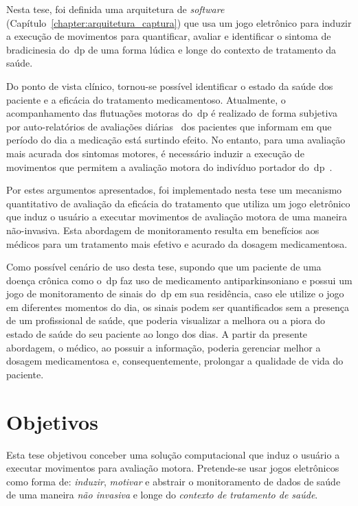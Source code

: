 Nesta tese, foi definida uma arquitetura de \textit{software} (Capítulo~\ref{chapter:arquitetura_captura}) que usa um jogo eletrônico para induzir a execução de movimentos para quantificar, avaliar e identificar o sintoma de bradicinesia do~\ac{dp} de uma forma lúdica e longe do contexto de tratamento da saúde.

Do ponto de vista clínico, tornou-se possível identificar o estado da saúde dos paciente e a eficácia do tratamento medicamentoso. Atualmente, o acompanhamento das flutuações motoras do~\ac{dp} é realizado de forma subjetiva por auto-relatórios de avaliações diárias~\cite{parkself2015,reviewassesenspark2015} dos pacientes que informam em que período do dia a medicação está surtindo efeito. No entanto, para uma avaliação mais acurada dos sintomas motores, é necessário induzir a execução de movimentos que permitem a avaliação motora do indivíduo portador do~\ac{dp}~\cite{wiiassesspark2016}.

Por estes argumentos apresentados, foi implementado nesta tese um mecanismo quantitativo de avaliação da eficácia do tratamento que utiliza um jogo eletrônico que induz o usuário a executar movimentos de avaliação motora de uma maneira não-invasiva. Esta abordagem de monitoramento resulta em benefícios aos médicos para um tratamento mais efetivo e acurado da dosagem medicamentosa. 

Como possível cenário de uso desta tese, supondo que um paciente de uma doença crônica como o~\ac{dp} faz uso de medicamento antiparkinsoniano e possui um jogo de monitoramento de sinais do~\ac{dp} em sua residência, caso ele utilize o jogo em diferentes momentos do dia, os sinais podem ser quantificados sem a presença de um profissional de saúde, que poderia visualizar a melhora ou a piora do estado de saúde do seu paciente ao longo dos dias. A partir da presente abordagem, o médico, ao possuir a informação, poderia gerenciar melhor a dosagem medicamentosa e, consequentemente, prolongar a qualidade de vida do paciente.

\section{Objetivos}\label{section:objetivos}
Esta tese objetivou conceber uma solução computacional que induz o usuário a executar movimentos para avaliação motora. Pretende-se usar jogos eletrônicos como forma de: \textit{induzir}, \textit{motivar} e abstrair o monitoramento de dados de saúde de uma maneira \textit{não invasiva} e longe do \textit{contexto de tratamento de saúde}.

